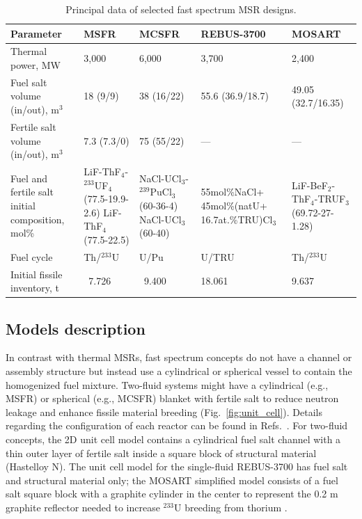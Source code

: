 \documentclass[letterpaper]{mandc2019}
\begin{document}
\begin{table}[t!]
\vspace{-0.3in}
  \centering
  \caption{Principal data of selected fast spectrum \gls{MSR} designs.}
  \label{table:fsmsr_concepts}
  \begin{tabular}{p{} p{} p{} p{} p{}} \toprule
   Parameter & \gls{MSFR} & \gls{MCSFR} & REBUS-3700 & \gls{MOSART} \\ \midrule
   Thermal power, MW 				&  3,000 & 6,000     & 3,700 & 2,400   \\
   Fuel salt volume (in/out), m$^3$       &18 (9/9)& 38 (16/22)& 55.6 (36.9/18.7) & 49.05 (32.7/16.35) \\
   Fertile salt volume (in/out), m$^3$ & 7.3 (7.3/0) & 75 (55/22)    & --- & --- \\
   Fuel and fertile salt initial composition, mol\% & LiF-ThF$_4$-$^{233}$UF$_4$ (77.5-19.9-2.6) LiF-ThF$_4$ \newline (77.5-22.5) & NaCl-UCl$_3$-$^{239}$PuCl$_3$ (60-36-4) \newline NaCl-UCl$_3$ \newline (60-40)
   & 55mol\%NaCl+ 45mol\%(natU+ 16.7at.\%TRU)Cl$_3$
   & LiF-BeF$_2$-ThF$_4$-TRUF$_3$  \newline (69.72-27-1.28) \\
   Fuel cycle & Th/$^{233}$U & U/Pu  & U/TRU & Th/$^{233}$U \\
   Initial fissile inventory, t & \ 7.726 & \ 9.400    & 18.061 & 9.637 \\ \bottomrule
   \end{tabular}
\end{table}
\subsection{Models description}
\label{sec:model}
In contrast with thermal \gls{MSR}s, fast spectrum concepts do not have a channel or assembly structure but instead use a cylindrical or spherical vessel to contain the homogenized fuel mixture.
Two-fluid systems might have a cylindrical (e.g., \gls{MSFR}) or spherical (e.g., \gls{MCSFR}) blanket with fertile salt to reduce neutron leakage and enhance fissile material breeding (Fig.~\ref{fig:unit_cell}). 
Details regarding the configuration of each reactor can be found in Refs.~\cite{euratom_final_2015, simmons_assessment_1974, mourogov_potentialities_2006-1,ignatiev_progress_2007}. 
For two-fluid concepts, the 2D unit cell model contains a cylindrical fuel salt channel with a thin outer layer of fertile salt inside a square block of structural material (Hastelloy N). 
The unit cell model for the single-fluid REBUS-3700 has fuel salt and structural material only; the \gls{MOSART} simplified model consists of a fuel salt square block with a graphite cylinder in the center to represent the 0.2 m graphite reflector needed to increase $^{233}$U breeding from thorium \cite{anshuman_chaube_arfc_2018}.
\end{document}
